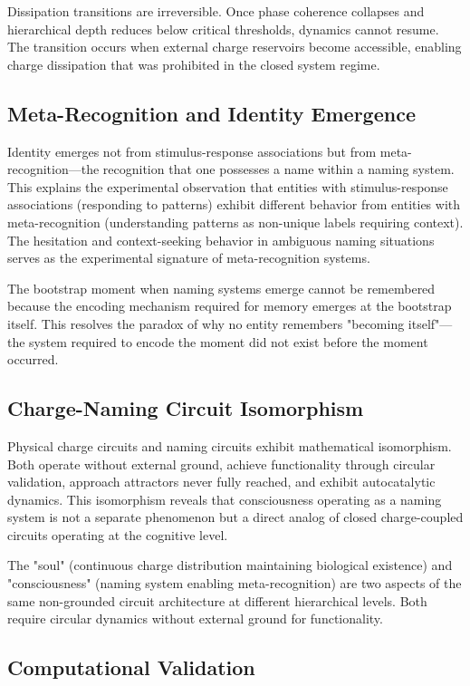 \documentclass[12pt,a4paper]{article}
\theoremstyle{plain}
\theoremstyle{definition}
\theoremstyle{remark}
\begin{document}
Dissipation transitions are irreversible. Once phase coherence collapses and hierarchical depth reduces below critical thresholds, dynamics cannot resume. The transition occurs when external charge reservoirs become accessible, enabling charge dissipation that was prohibited in the closed system regime.

\subsection{Meta-Recognition and Identity Emergence}

Identity emerges not from stimulus-response associations but from meta-recognition—the recognition that one possesses a name within a naming system. This explains the experimental observation that entities with stimulus-response associations (responding to patterns) exhibit different behavior from entities with meta-recognition (understanding patterns as non-unique labels requiring context). The hesitation and context-seeking behavior in ambiguous naming situations serves as the experimental signature of meta-recognition systems.

The bootstrap moment when naming systems emerge cannot be remembered because the encoding mechanism required for memory emerges at the bootstrap itself. This resolves the paradox of why no entity remembers "becoming itself"—the system required to encode the moment did not exist before the moment occurred.

\subsection{Charge-Naming Circuit Isomorphism}

Physical charge circuits and naming circuits exhibit mathematical isomorphism. Both operate without external ground, achieve functionality through circular validation, approach attractors never fully reached, and exhibit autocatalytic dynamics. This isomorphism reveals that consciousness operating as a naming system is not a separate phenomenon but a direct analog of closed charge-coupled circuits operating at the cognitive level.

The "soul" (continuous charge distribution maintaining biological existence) and "consciousness" (naming system enabling meta-recognition) are two aspects of the same non-grounded circuit architecture at different hierarchical levels. Both require circular dynamics without external ground for functionality.

\subsection{Computational Validation}
\end{document}
